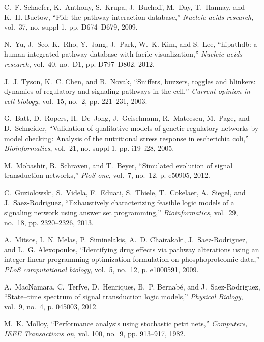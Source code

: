 \documentclass[runningheads,a4paper]{llncs}
\begin{document}
\begin{thebibliography}{4}

C.~F. Schaefer, K.~Anthony, S.~Krupa, J.~Buchoff, M.~Day, T.~Hannay, and K.~H.
  Buetow, ``Pid: the pathway interaction database,'' \emph{Nucleic acids
  research}, vol.~37, no. suppl 1, pp. D674--D679, 2009.

N.~Yu, J.~Seo, K.~Rho, Y.~Jang, J.~Park, W.~K. Kim, and S.~Lee, ``hipathdb: a
  human-integrated pathway database with facile visualization,'' \emph{Nucleic
  acids research}, vol.~40, no.~D1, pp. D797--D802, 2012.

J.~J. Tyson, K.~C. Chen, and B.~Novak, ``Sniffers, buzzers, toggles and
  blinkers: dynamics of regulatory and signaling pathways in the cell,''
  \emph{Current opinion in cell biology}, vol.~15, no.~2, pp. 221--231, 2003.

G.~Batt, D.~Ropers, H.~De~Jong, J.~Geiselmann, R.~Mateescu, M.~Page, and
  D.~Schneider, ``Validation of qualitative models of genetic regulatory
  networks by model checking: Analysis of the nutritional stress response in
  escherichia coli,'' \emph{Bioinformatics}, vol.~21, no. suppl 1, pp.
  i19--i28, 2005.

M.~Mobashir, B.~Schraven, and T.~Beyer, ``Simulated evolution of signal
  transduction networks,'' \emph{PloS one}, vol.~7, no.~12, p. e50905, 2012.

C.~Guziolowski, S.~Videla, F.~Eduati, S.~Thiele, T.~Cokelaer, A.~Siegel, and
  J.~Saez-Rodriguez, ``Exhaustively characterizing feasible logic models of a
  signaling network using answer set programming,'' \emph{Bioinformatics},
  vol.~29, no.~18, pp. 2320--2326, 2013.

A.~Mitsos, I.~N. Melas, P.~Siminelakis, A.~D. Chairakaki, J.~Saez-Rodriguez,
  and L.~G. Alexopoulos, ``Identifying drug effects via pathway alterations
  using an integer linear programming optimization formulation on
  phosphoproteomic data,'' \emph{PLoS computational biology}, vol.~5, no.~12,
  p. e1000591, 2009.

A.~MacNamara, C.~Terfve, D.~Henriques, B.~P. Bernab{\'e}, and
  J.~Saez-Rodriguez, ``State--time spectrum of signal transduction logic
  models,'' \emph{Physical Biology}, vol.~9, no.~4, p. 045003, 2012.

M.~K. Molloy, ``Performance analysis using stochastic petri nets,''
  \emph{Computers, IEEE Transactions on}, vol. 100, no.~9, pp. 913--917, 1982.


\end{thebibliography}
\end{document}
